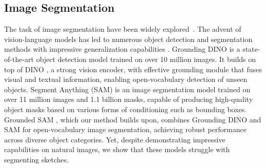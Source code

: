

\subsection{Image Segmentation}
The task of image segmentation have been widely explored~\cite{he2018maskrcnn,  Bolya_2019_yolact, cheng2021mask2former, wang2021solo}. 
The advent of vision-language models \cite{radford2021clip, liu2023llava,xiao2023florence} has led to numerous object detection and segmentation methods with
impressive generalization capabilities \cite{zhang2022glipv2, ren2024grounded, kirillov2023segany, minderer2022owlvit}.
Grounding DINO \cite{liu2023grounding} is a state-of-the-art object detection model trained on over 10 million images. It builds on top of DINO \cite{DINOcaron2021emerging}, a strong vision encoder, with effective grounding module that fuses visual and textual information, enabling open-vocabulary detection of unseen objects. Segment Anything (SAM) \cite{kirillov2023segany} is an image segmentation model trained on over 11 million images and 1.1 billion masks, capable of producing high-quality object masks based on various forms of conditioning such as bounding boxes. Grounded SAM \cite{ren2024grounded}, which our method builds upon, combines Grounding DINO and SAM for open-vocabulary image segmentation, achieving robust performance across diverse object categories. 
Yet, despite demonstrating impressive capabilities on natural images, we show that these models struggle with segmenting sketches.  

